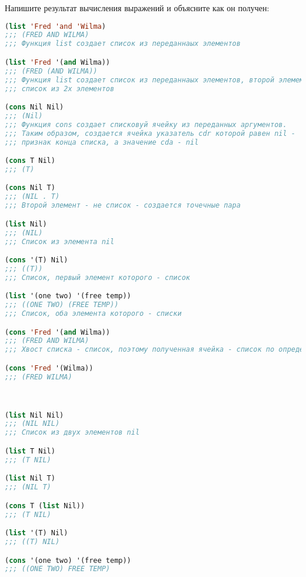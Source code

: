 Напишите результат вычисления выражений и объясните как он получен:

\begin{lstlisting}[language=Lisp]
(list 'Fred 'and 'Wilma)
;;; (FRED AND WILMA)
;;; Функция list создает список из переданнаых элементов

(list 'Fred '(and Wilma))
;;; (FRED (AND WILMA))
;;; Функция list создает список из переданнаых элементов, второй элемемнт -
;;; список из 2х элементов

(cons Nil Nil)
;;; (Nil)
;;; Функция cons создает списковуй ячейку из переданных аргументов.
;;; Таким образом, создается ячейка указатель cdr которой равен nil -
;;; признак конца списка, а значение cda - nil

(cons T Nil)
;;; (T)

(cons Nil T)
;;; (NIL . T)
;;; Второй элемент - не список - создается точечные пара

(list Nil)
;;; (NIL)
;;; Список из элемента nil

(cons '(T) Nil)
;;; ((T))
;;; Список, первый элемент которого - список

(list '(one two) '(free temp))
;;; ((ONE TWO) (FREE TEMP))
;;; Список, оба элемента которого - списки

(cons 'Fred '(and Wilma))
;;; (FRED AND WILMA)
;;; Хвост списка - список, поэтому полученная ячейка - список по определению

(cons 'Fred '(Wilma))
;;; (FRED WILMA)



(list Nil Nil)
;;; (NIL NIL)
;;; Список из двух элементов nil

(list T Nil)
;;; (T NIL)

(list Nil T)
;;; (NIL T)

(cons T (list Nil))
;;; (T NIL)

(list '(T) Nil)
;;; ((T) NIL)

(cons '(one two) '(free temp))
;;; ((ONE TWO) FREE TEMP)
\end{lstlisting}

